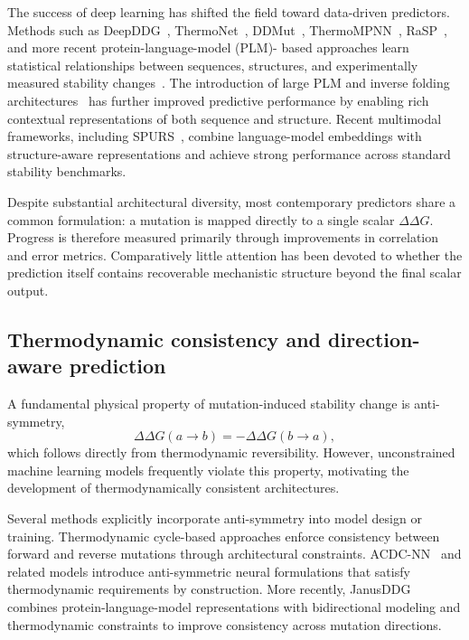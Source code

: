 \documentclass[11pt,a4paper]{article}
\theoremstyle{plain}
\theoremstyle{definition}
\begin{document}
The success of deep learning has shifted the field toward data-driven predictors. Methods such as DeepDDG~\cite{cao2019deepddg}, ThermoNet~\cite{li2020predicting}, DDMut~\cite{zhou2023ddmut}, ThermoMPNN~\cite{dieckhaus2024transfer}, RaSP~\cite{blaabjerg2023rapid}, and more recent protein-language-model (PLM)- based approaches learn statistical relationships between sequences, structures, and experimentally measured stability changes~\cite{rives2021biological,brandes2022proteinbert,ofer2021language,lin2023evolutionary}. The introduction of large PLM and inverse folding architectures~\cite{dauparas2022robust} has further improved predictive performance by enabling rich contextual representations of both sequence and structure. Recent multimodal frameworks, including SPURS~\cite{li2025generalizable}, combine language-model embeddings with structure-aware representations and achieve strong performance across standard stability benchmarks.

Despite substantial architectural diversity, most contemporary predictors share a common formulation: a mutation is mapped directly to a single scalar $\Delta\Delta G$. Progress is therefore measured primarily through improvements in correlation and error metrics. Comparatively little attention has been devoted to whether the prediction itself contains recoverable mechanistic structure beyond the final scalar output.

\subsection{Thermodynamic consistency and direction-aware prediction}
A fundamental physical property of mutation-induced stability change is anti-symmetry,
\[
\Delta\Delta G(a \rightarrow b) = -\Delta\Delta G(b \rightarrow a),
\]
which follows directly from thermodynamic reversibility. However, unconstrained machine learning models frequently violate this property, motivating the development of thermodynamically consistent architectures.

Several methods explicitly incorporate anti-symmetry into model design or training. Thermodynamic cycle-based approaches enforce consistency between forward and reverse mutations through architectural constraints. ACDC-NN~\cite{benevenuta2021antisymmetric} and related models introduce anti-symmetric neural formulations that satisfy thermodynamic requirements by construction. More recently, JanusDDG~\cite{barducci2026janusddg} combines protein-language-model representations with bidirectional modeling and thermodynamic constraints to improve consistency across mutation directions.
\end{document}
